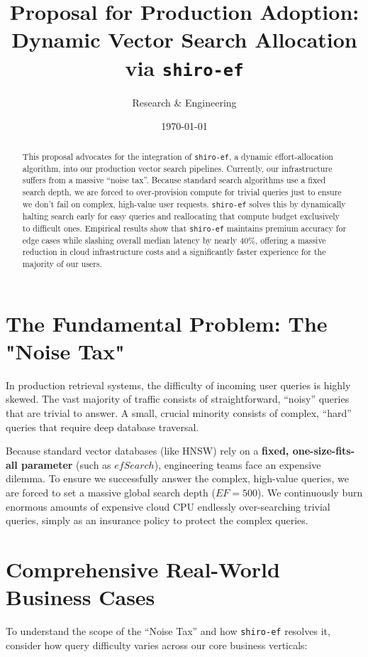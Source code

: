 \documentclass[11pt, a4paper]{article}
\title{\vspace{-1.5cm}\textbf{Proposal for Production Adoption:\\Dynamic Vector Search Allocation via \texttt{shiro-ef}}}
\author{Research \& Engineering}
\date{\today}
\begin{document}
\maketitle

\begin{abstract}
This proposal advocates for the integration of \texttt{shiro-ef}, a dynamic effort-allocation algorithm, into our production vector search pipelines. Currently, our infrastructure suffers from a massive ``noise tax''. Because standard search algorithms use a fixed search depth, we are forced to over-provision compute for trivial queries just to ensure we don't fail on complex, high-value user requests. \texttt{shiro-ef} solves this by dynamically halting search early for easy queries and reallocating that compute budget exclusively to difficult ones. Empirical results show that \texttt{shiro-ef} maintains premium accuracy for edge cases while slashing overall median latency by nearly 40\%, offering a massive reduction in cloud infrastructure costs and a significantly faster experience for the majority of our users.
\end{abstract}

\section{The Fundamental Problem: The "Noise Tax"}
In production retrieval systems, the difficulty of incoming user queries is highly skewed. The vast majority of traffic consists of straightforward, ``noisy'' queries that are trivial to answer. A small, crucial minority consists of complex, ``hard'' queries that require deep database traversal.

Because standard vector databases (like HNSW) rely on a \textbf{fixed, one-size-fits-all parameter} (such as $efSearch$), engineering teams face an expensive dilemma. To ensure we successfully answer the complex, high-value queries, we are forced to set a massive global search depth ($EF=500$). We continuously burn enormous amounts of expensive cloud CPU endlessly over-searching trivial queries, simply as an insurance policy to protect the complex queries.

\section{Comprehensive Real-World Business Cases}
To understand the scope of the ``Noise Tax'' and how \texttt{shiro-ef} resolves it, consider how query difficulty varies across our core business verticals:
\end{document}
